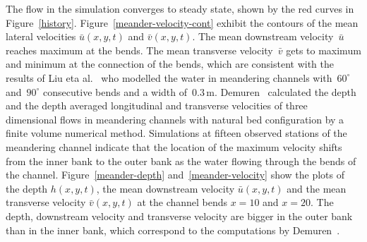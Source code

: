 \documentclass[a5paper,12pt]{article}
\newcommand{\uu}{{\bar u}}
\newcommand{\vv}{{\bar v}}
\begin{document}
The flow in the simulation converges to steady state, shown by the red curves in Figure~\ref{history}.
Figure~\ref{meander-velocity-cont} exhibit the contours of the mean lateral velocities $\uu(x,y,t)$ and $\vv(x,y,t)$. 
The mean downstream velocity~$\uu$ reaches maximum at the bends.
The mean transverse velocity~$\vv$ gets to maximum and minimum at the connection of the bends, which are consistent with the results of Liu eta al.~\cite{Liu2009} who modelled the water in meandering channels with~$60^\circ$ and~$90^\circ$ consecutive bends and a width of~$0.3$\,m.
Demuren~\cite{Demuren1993} calculated the depth and the depth averaged longitudinal and transverse velocities of three dimensional flows in meandering channels with natural bed configuration by a finite volume numerical method. 
Simulations at fifteen observed stations of the meandering channel indicate that the location of the maximum velocity shifts from the inner bank to the outer bank as the water flowing through the bends of the channel. 
Figure~\ref{meander-depth} and~\ref{meander-velocity} show the plots of the depth $h(x,y,t)$, the mean downstream velocity $\uu(x,y,t)$ and the mean transverse velocity $\vv(x,y,t)$ at the channel bends $x=10$ and $x=20$.
The depth, downstream velocity and transverse velocity are bigger in the outer bank than in the inner bank, which correspond to the computations by Demuren~\cite{Demuren1993}. 
\end{document}
